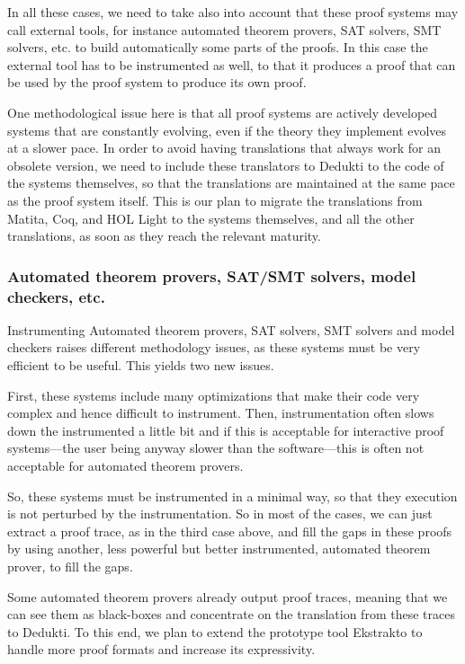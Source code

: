 In all these cases, we need to take also into account that these proof
systems may call external tools, for instance automated theorem
provers, SAT solvers, SMT solvers, etc. to build automatically some
parts of the proofs. In this case the external tool has to be
instrumented as well, to that it produces a proof that can be used by
the proof system to produce its own proof.

One methodological issue here is that all proof systems are actively
developed systems that are constantly evolving, even if the theory
they implement evolves at a slower pace. In order to avoid having
translations that always work for an obsolete version, we need to
include these translators to Dedukti to the code of the systems
themselves, so that the translations are maintained at the same pace
as the proof system itself. This is our plan to migrate the
translations from Matita, Coq, and HOL Light to the systems
themselves, and all the other translations, as soon as they reach the
relevant maturity.

\subsubsection*{Automated theorem provers, SAT/SMT solvers, model checkers,
  etc.}

Instrumenting Automated theorem provers, SAT solvers, SMT solvers and
model checkers raises different methodology issues, as these systems
must be very efficient to be useful. This yields two new issues.

First, these systems include many optimizations that make their code
very complex and hence difficult to instrument. Then, instrumentation
often slows down the instrumented a little bit and if this is acceptable
for interactive proof systems---the user being anyway slower than the
software---this is often not acceptable for automated theorem provers.

So, these systems must be instrumented in a minimal way, so that they
execution is not perturbed by the instrumentation. So in most of the
cases, we can just extract a proof trace, as in the third case above,
and fill the gaps in these proofs by using another, less powerful but better
instrumented, automated theorem prover, to fill the gaps. 

Some automated theorem provers already output proof traces, meaning
that we can see them as black-boxes and concentrate on the translation
from these traces to Dedukti. To this end, we plan to extend the
prototype tool Ekstrakto to handle more proof formats and increase its
expressivity.


